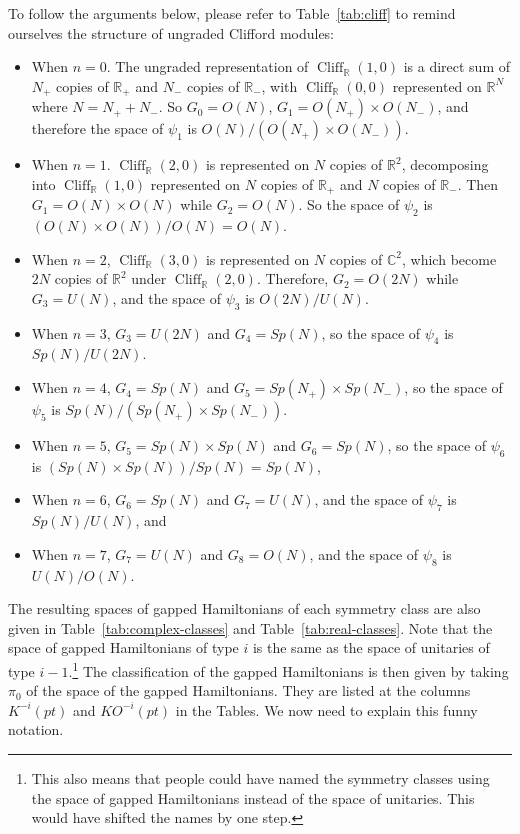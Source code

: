 \documentclass[12pt]{article}
\numberwithin{equation}{section}
\numberwithin{figure}{section}
\theoremstyle{remark}
\def\bC{\mathbb{C}}
\def\bR{\mathbb{R}}
\def\Cliff{\mathop{\mathrm{Cliff}}\nolimits}
\begin{document}
To follow the arguments below, please refer to Table~\ref{tab:cliff} to remind ourselves
the structure of ungraded Clifford modules:
\begin{itemize}
  \item When $n=0$. The ungraded representation of $\Cliff_\bR(1,0)$ is
   a direct sum of $N_+$ copies of $\bR_+$ and $N_-$ copies of $\bR_-$,
   with $\Cliff_\bR(0,0)$ represented on $\bR^{N}$ where $N=N_++N_-$.
   So $G_0=O(N)$, $G_1=O(N_+)\times O(N_-)$,
   and therefore the space of $\psi_1$ is $O(N)/(O(N_+)\times O(N_-))$.
\item When $n=1$. $\Cliff_\bR(2,0)$ is represented on $N$ copies of $\bR^2$,
decomposing into $\Cliff_\bR(1,0)$ represented on $N$ copies of $\bR_+$ and $N$ copies of $\bR_-$.
Then $G_1=O(N)\times O(N)$ while $G_2=O(N)$. So the space of $\psi_2$ is $(O(N)\times O(N))/O(N)=O(N)$.
\item When $n=2$, $\Cliff_\bR(3,0)$ is represented on $N$ copies of $\bC^2$,
which become $2N$ copies of $\bR^2$ under $\Cliff_\bR(2,0)$.
Therefore, $G_2=O(2N)$ while $G_3=U(N)$, and the space of $\psi_3$ is $O(2N)/U(N)$.
\item When $n=3$, $G_3=U(2N)$ and $G_4=Sp(N)$, so the space of $\psi_4$ is $Sp(N)/U(2N)$.
\item When $n=4$, $G_4=Sp(N)$ and $G_5=Sp(N_+)\times Sp(N_-)$, so the space of $\psi_5$ is $Sp(N)/(Sp(N_+)\times Sp(N_-))$.
\item When $n=5$, $G_5=Sp(N)\times Sp(N)$ and $G_6=Sp(N)$, so the space of $\psi_6$ is $(Sp(N)\times Sp(N))/Sp(N)=Sp(N)$,
\item When $n=6$, $G_6=Sp(N)$ and $G_7=U(N)$, and the space of $\psi_7$ is $Sp(N)/U(N)$, and 
\item When $n=7$, $G_7=U(N)$ and $G_8=O(N)$, and the space of $\psi_8$ is $U(N)/O(N)$.
\end{itemize}
The resulting spaces of gapped Hamiltonians of each symmetry class 
are also given in Table~\ref{tab:complex-classes} and Table~\ref{tab:real-classes}.
Note that the space of gapped Hamiltonians of type $i$ is 
the same as the space of unitaries of type $i-1$.\footnote{%
This also means that people could have named the symmetry classes using the space of gapped Hamiltonians
instead of the space of unitaries. This would have shifted the names by one step.
}
The classification of the gapped Hamiltonians is then given by taking 
$\pi_0$ of the space of the gapped Hamiltonians.
They are listed at the columns $K^{-i}(pt)$ and $KO^{-i}(pt)$ in the Tables.
We now need to explain this funny notation.
\end{document}
